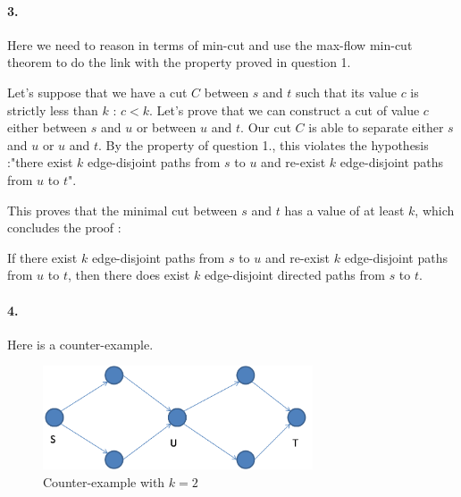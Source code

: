 \paragraph{3.}
Here we need to reason in terms of min-cut and use the max-flow min-cut theorem to do the link with the property proved in question 1.

Let's suppose that we have a cut $C$ between $s$ and $t$ such that its value $c$ is strictly less than $k$ : $c < k$.
Let's prove that we can construct a cut of value $c$ either between $s$ and $u$ or between $u$ and $t$. Our cut $C$ is able to separate either $s$ and $u$ or $u$ and $t$. By the property of question 1., this violates the hypothesis :"there exist $k$ edge-disjoint paths from $s$ to $u$ and re-exist $k$ edge-disjoint paths from $u$ to $t$".

This proves that the minimal cut between $s$ and $t$ has a value of at least $k$, which concludes the proof :

If there exist $k$ edge-disjoint paths from $s$ to $u$ and re-exist $k$ edge-disjoint paths from $u$ to $t$, then there does exist $k$ edge-disjoint directed paths from $s$ to $t$.





\paragraph{4.}
Here is a counter-example.

\begin{figure}[H]
\centering
\includegraphics[width=8cm]{fig4b.png}
\caption{Counter-example with $k=2$}
\label{fig4}
\end{figure}
